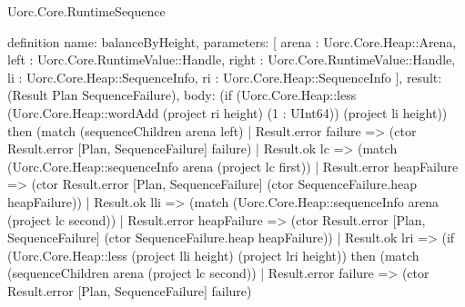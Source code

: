\begin{lexlean}{Uorc.Core.RuntimeSequence}
\begin{semanticmodule}
definition{
  name: balanceByHeight,
  parameters: [
    arena : Uorc.Core.Heap::Arena,
    left : Uorc.Core.RuntimeValue::Handle,
    right : Uorc.Core.RuntimeValue::Handle,
    li : Uorc.Core.Heap::SequenceInfo,
    ri : Uorc.Core.Heap::SequenceInfo
  ],
  result: (Result Plan SequenceFailure),
  body: (if (Uorc.Core.Heap::less (Uorc.Core.Heap::wordAdd (project ri height) (1 : UInt64)) (project li height)) then (match (sequenceChildren arena left)
    | Result.error failure => (ctor Result.error [Plan, SequenceFailure] failure)
    | Result.ok lc => (match (Uorc.Core.Heap::sequenceInfo arena (project lc first))
      | Result.error heapFailure => (ctor Result.error [Plan, SequenceFailure] (ctor SequenceFailure.heap heapFailure))
      | Result.ok lli => (match (Uorc.Core.Heap::sequenceInfo arena (project lc second))
        | Result.error heapFailure => (ctor Result.error [Plan, SequenceFailure] (ctor SequenceFailure.heap heapFailure))
        | Result.ok lri => (if (Uorc.Core.Heap::less (project lli height) (project lri height)) then (match (sequenceChildren arena (project lc second))
          | Result.error failure => (ctor Result.error [Plan, SequenceFailure] failure)
}
\end{semanticmodule}
\end{lexlean}
